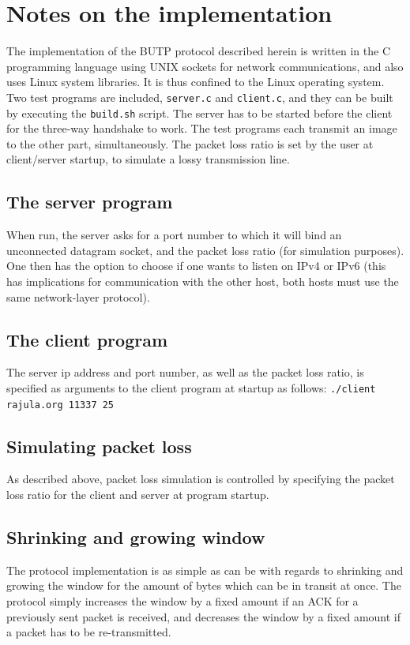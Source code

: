 \documentclass{article}
\begin{document}
\section{Notes on the implementation}
The implementation of the BUTP protocol described herein is written in the C programming language using UNIX sockets for network communications, and also uses Linux system libraries. It is thus confined to the Linux operating system. Two test programs are included, \texttt{server.c} and \texttt{client.c}, and they can be built by executing the \texttt{build.sh} script. The server has to be started before the client for the three-way handshake to work.  The test programs each transmit an image to the other part, simultaneously. The packet loss ratio is set by the user at client/server startup, to simulate a lossy transmission line.
\subsection{The server program}
When run, the server asks for a port number to which it will bind an unconnected datagram socket, and the packet loss ratio (for simulation purposes). One then has the option to choose if one wants to listen on IPv4 or IPv6 (this has implications for communication with the other host, both hosts must use the same network-layer protocol).

\subsection{The client program}
The server ip address and port number, as well as the packet loss ratio, is specified as arguments to the client program at startup as follows:\newline
\texttt{./client rajula.org 11337 25}

\subsection{Simulating packet loss}
As described above, packet loss simulation is controlled by specifying the packet loss ratio for the client and server at program startup.

\subsection{Shrinking and growing window}
The protocol implementation is as simple as can be with regards to shrinking and growing the window for the amount of bytes which can be in transit at once. The protocol simply increases the window by a fixed amount if an ACK for a previously sent packet is received, and decreases the window by a fixed amount if a packet has to be re-transmitted.
\end{document}
